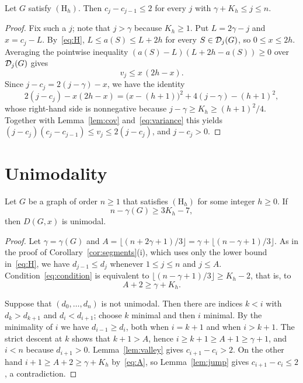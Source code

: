 \begin{lemma}\label{lem:jump}
Let $G$ satisfy $(\mathrm{H}_h)$. Then $c_j-c_{j-1}\le 2$ for every $j$ with
$\gamma+K_h\le j\le n$.
\end{lemma}

\begin{proof}
Fix such a $j$; note that $j>\gamma$ because $K_h\ge1$. Put $L=2\gamma-j$ and
$x=c_j-L$. By~\eqref{eq:H}, $L\le a(S)\le L+2h$ for every $S\in\mathcal{D}_j(G)$, so
$0\le x\le 2h$. Averaging the pointwise inequality
$(a(S)-L)(L+2h-a(S))\ge0$ over $\mathcal{D}_j(G)$ gives
\begin{equation}\label{eq:variance}
  v_j\le x\,(2h-x) .
\end{equation}
Since $j-c_j=2(j-\gamma)-x$, we have the identity
\[
  2(j-c_j)-x(2h-x)=\bigl(x-(h+1)\bigr)^2+4(j-\gamma)-(h+1)^2 ,
\]
whose right-hand side is nonnegative because $j-\gamma\ge K_h\ge(h+1)^2/4$.
Together with Lemma~\ref{lem:cov} and~\eqref{eq:variance} this yields
$(j-c_j)(c_j-c_{j-1})\le v_j\le 2(j-c_j)$, and $j-c_j>0$.
\end{proof}

\section{Unimodality}\label{sec:unimodal}

\begin{theorem}\label{thm:main}
Let $G$ be a graph of order $n\ge1$ that satisfies $(\mathrm{H}_h)$ for some
integer $h\ge0$. If
\begin{equation}\label{eq:condition}
  n-\gamma(G)\ge 3K_h-7 ,
\end{equation}
then $D(G,x)$ is unimodal.
\end{theorem}

\begin{proof}
Let $\gamma=\gamma(G)$ and $A=\lfloor(n+2\gamma+1)/3\rfloor
=\gamma+\lfloor(n-\gamma+1)/3\rfloor$. As in the proof of
Corollary~\ref{cor:segments}(i), which uses only the lower bound
in~\eqref{eq:H}, we have $d_{j-1}\le d_j$ whenever $1\le j\le n$ and $j\le A$.
Condition~\eqref{eq:condition} is equivalent to
$\lfloor(n-\gamma+1)/3\rfloor\ge K_h-2$, that is, to
\begin{equation}\label{eq:A}
  A+2\ge\gamma+K_h .
\end{equation}

Suppose that $(d_0,\dots,d_n)$ is not unimodal. Then there are indices $k<i$
with $d_k>d_{k+1}$ and $d_i<d_{i+1}$; choose $k$ minimal and then $i$ minimal.
By the minimality of $i$ we have $d_{i-1}\ge d_i$, both when $i=k+1$ and when
$i>k+1$. The strict descent at $k$ shows that $k+1>A$, hence $i\ge k+1\ge
A+1\ge\gamma+1$, and $i<n$ because $d_{i+1}>0$. Lemma~\ref{lem:valley}
gives $c_{i+1}-c_i>2$. On the other hand $i+1\ge A+2\ge\gamma+K_h$
by~\eqref{eq:A}, so Lemma~\ref{lem:jump} gives $c_{i+1}-c_i\le2$, a
contradiction.
\end{proof}

